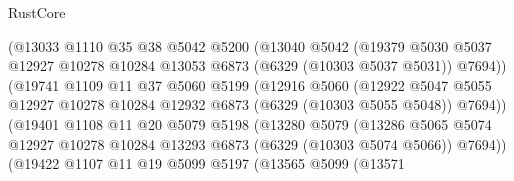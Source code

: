 \begin{lexlean}{RustCore}
\begin{coremodule}
                            (@13033
                              @1110
                              @35
                              @38
                              @5042
                              @5200
                              (@13040
                                @5042
                                (@19379
                                  @5030
                                  @5037
                                  @12927
                                  @10278
                                  @10284
                                  @13053
                                  @6873
                                  (@6329 (@10303 @5037 @5031))
                                  @7694))
                              (@19741
                                @1109
                                @11
                                @37
                                @5060
                                @5199
                                (@12916
                                  @5060
                                  (@12922
                                    @5047
                                    @5055
                                    @12927
                                    @10278
                                    @10284
                                    @12932
                                    @6873
                                    (@6329 (@10303 @5055 @5048))
                                    @7694))
                                (@19401
                                  @1108
                                  @11
                                  @20
                                  @5079
                                  @5198
                                  (@13280
                                    @5079
                                    (@13286
                                      @5065
                                      @5074
                                      @12927
                                      @10278
                                      @10284
                                      @13293
                                      @6873
                                      (@6329 (@10303 @5074 @5066))
                                      @7694))
                                  (@19422
                                    @1107
                                    @11
                                    @19
                                    @5099
                                    @5197
                                    (@13565
                                      @5099
                                      (@13571

\end{coremodule}
\end{lexlean}

